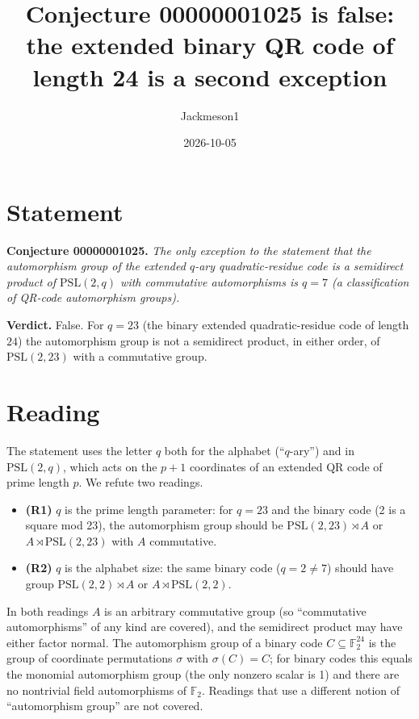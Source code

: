 \documentclass[11pt]{article}
\title{Conjecture 00000001025 is false:\\ the extended binary QR code of length 24 is a second exception}
\author{Jackmeson1}
\date{2026-10-05}
\begin{document}
\maketitle

\section*{Statement}
\textbf{Conjecture 00000001025.} \emph{The only exception to the statement that the automorphism group of the
extended $q$-ary quadratic-residue code is a semidirect product of $\mathrm{PSL}(2,q)$ with commutative automorphisms
is $q = 7$ (a classification of QR-code automorphism groups).}

\textbf{Verdict.} False. For $q = 23$ (the binary extended quadratic-residue code of length $24$) the automorphism
group is not a semidirect product, in either order, of $\mathrm{PSL}(2,23)$ with a commutative group.

\section*{Reading}
The statement uses the letter $q$ both for the alphabet (``$q$-ary'') and in $\mathrm{PSL}(2,q)$, which acts on the
$p+1$ coordinates of an extended QR code of prime length $p$. We refute two readings.
\begin{itemize}
\item \textbf{(R1)} $q$ is the prime length parameter: for $q = 23$ and the binary code (2 is a square mod 23), the
automorphism group should be $\mathrm{PSL}(2,23)\rtimes A$ or $A\rtimes\mathrm{PSL}(2,23)$ with $A$ commutative.
\item \textbf{(R2)} $q$ is the alphabet size: the same binary code ($q = 2 \ne 7$) should have group
$\mathrm{PSL}(2,2)\rtimes A$ or $A\rtimes \mathrm{PSL}(2,2)$.
\end{itemize}
In both readings $A$ is an arbitrary commutative group (so ``commutative automorphisms'' of any kind are covered),
and the semidirect product may have either factor normal. The automorphism group of a binary code $C\subseteq
\mathbb{F}_2^{24}$ is the group of coordinate permutations $\sigma$ with $\sigma(C) = C$; for binary codes this
equals the monomial automorphism group (the only nonzero scalar is 1) and there are no nontrivial field automorphisms of
$\mathbb{F}_2$. Readings that use a different notion of ``automorphism group'' are not covered.
\end{document}
